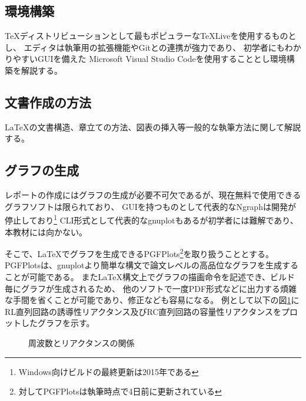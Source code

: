 \documentclass[uplatex]{jsarticle}
\begin{document}
	\subsection{環境構築}
		\TeX ディストリビューションとして最もポピュラーな\TeX Liveを使用するものとし、
		エディタは執筆用の拡張機能やGitとの連携が強力であり、
		初学者にもわかりやすいGUIを備えた
		Microsoft Visual Studio Codeを使用することとし環境構築を解説する。

	\subsection{文書作成の方法}
		\LaTeX の文書構造、章立ての方法、図表の挿入等一般的な執筆方法に関して解説する。

	\subsection{グラフの生成}
		レポートの作成にはグラフの生成が必要不可欠であるが、現在無料で使用できるグラフソフトは限られており、
		GUIを持つものとして代表的なNgraphは開発が停止しており\footnote{Windows向けビルドの最終更新は2015年である}
		CLI形式として代表的なgnuplotもあるが初学者には難解であり、本教材には向かない。

		そこで、\LaTeX でグラフを生成できるPGFPlots\footnote{対してPGFPlotsは執筆時点で4日前に更新されている}を取り扱うこととする。
		PGFPlotsは、gnuplotより簡単な構文で論文レベルの高品位なグラフを生成することが可能である。
		また\LaTeX 構文上でグラフの描画命令を記述でき、ビルド毎にグラフが生成されるため、
		他のソフトで一度PDF形式などに出力する煩雑な手間を省くことが可能であり、修正なども容易になる。
		例として以下の図\ref{fig:XLXC}に
		RL直列回路の誘導性リアクタンス及びRC直列回路の容量性リアクタンスをプロットしたグラフを示す。

		\begin{figure}[H]
			\centering
			\caption{周波数とリアクタンスの関係}
			\label{fig:XLXC}
		\end{figure}
\end{document}
